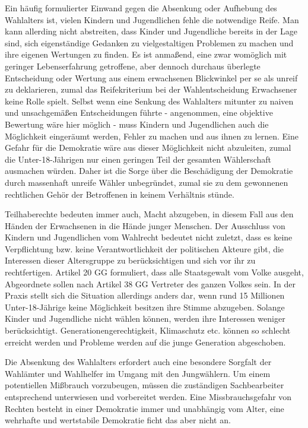 {Ein häufig formulierter Einwand gegen die Absenkung oder Aufhebung des Wahlalters ist, vielen Kindern und Jugendlichen fehle die notwendige Reife. Man kann allerding nicht abstreiten, dass Kinder und Jugendliche bereits in der Lage sind, sich eigenständige Gedanken zu vielgestaltigen Problemen zu machen und ihre eigenen Wertungen zu finden. Es ist anmaßend, eine zwar womöglich mit geringer Lebenserfahrung getroffene, aber dennoch durchaus überlegte Entscheidung oder Wertung aus einem erwachsenen Blickwinkel per se als unreif zu deklarieren, zumal das Reifekriterium bei der Wahlentscheidung Erwachsener keine Rolle spielt. Selbst wenn eine Senkung des Wahlalters mitunter zu naiven und unsachgemäßen Entscheidungen führte - angenommen, eine objektive Bewertung wäre hier möglich - muss Kindern und Jugendlichen auch die Möglichkeit eingeräumt werden, Fehler zu machen und aus ihnen zu lernen. Eine Gefahr für die Demokratie wäre aus dieser Möglichkeit nicht abzuleiten, zumal die Unter-18-Jährigen nur einen geringen Teil der gesamten Wählerschaft ausmachen würden. Daher ist die Sorge über die Beschädigung der Demokratie durch massenhaft unreife Wähler unbegründet, zumal sie zu dem gewonnenen rechtlichen Gehör der Betroffenen in keinem Verhältnis stünde.

Teilhaberechte bedeuten immer auch, Macht abzugeben, in diesem Fall aus den Händen der Erwachsenen in die Hände junger Menschen. Der Ausschluss von Kindern und Jugendlichen vom Wahlrecht bedeutet nicht zuletzt, dass es keine Verpflichtung bzw. keine Verantwortlichkeit der politischen Akteure gibt, die Interessen dieser Altersgruppe zu berücksichtigen und sich vor ihr zu rechtfertigen. Artikel 20 GG formuliert, dass alle Staatsgewalt vom Volke ausgeht, Abgeordnete sollen nach Artikel 38 GG Vertreter des ganzen Volkes sein. In der Praxis stellt sich die Situation allerdings anders dar, wenn rund 15 Millionen Unter-18-Jährige keine Möglichkeit besitzen ihre Stimme abzugeben. Solange Kinder und Jugendliche nicht wählen können, werden ihre Interessen weniger berücksichtigt. Generationengerechtigkeit, Klimaschutz etc. können so schlecht erreicht werden und Probleme werden auf die junge Generation abgeschoben.

Die Absenkung des Wahlalters erfordert auch eine besondere Sorgfalt der Wahlämter und Wahlhelfer im Umgang mit den Jungwählern. Um einem potentiellen Mißbrauch vorzubeugen, müssen die zuständigen Sachbearbeiter entsprechend unterwiesen und vorbereitet werden. Eine Missbrauchsgefahr von Rechten besteht in einer Demokratie immer und unabhängig vom Alter, eine wehrhafte und wertstabile Demokratie ficht das aber nicht an.

}
